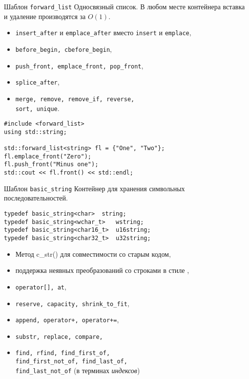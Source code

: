 \documentclass[aspectration=1610,t]{beamer}
\begin{document}
\begin{frame}[fragile]{Шаблон \texttt{forward\_list}}
Односвязный список. В любом месте контейнера 
вставка и удаление производятся за $O(1)$.
\begin{itemize}
    \item \texttt{insert\_after} и \texttt{emplace\_after} вместо \texttt{insert} и \texttt{emplace},
    \item  \texttt{before\_begin, cbefore\_begin},
    \item {\tt push\_front, emplace\_front, pop\_front},
    \item {\tt splice\_after},
    \item {\tt merge, remove, remove\_if, reverse,\\ sort, unique}.
\end{itemize}

\begin{lstlisting}
#include <forward_list>
using std::string;

std::forward_list<string> fl = {"One", "Two"};
fl.emplace_front("Zero");
fl.push_front("Minus one");
std::cout << fl.front() << std::endl;
\end{lstlisting}
\end{frame}

\begin{frame}[fragile]{Шаблон {\tt basic\_string}}
Контейнер для хранения символьных последовательностей.
\begin{lstlisting}
typedef basic_string<char>	string;
typedef basic_string<wchar_t> 	wstring;
typedef basic_string<char16_t> 	u16string;
typedef basic_string<char32_t>	u32string;
\end{lstlisting}
\begin{itemize}
    \item Метод {c\_str()} для совместимости со старым кодом, 
    \item поддержка неявных преобразований со строками в стиле \langc,
    \item \texttt{operator[], at},
    \item \texttt{reserve, capacity, shrink\_to\_fit},
    \item \texttt{append, operator+, operator+=},
    \item \texttt{substr, replace, compare,} 
    \item \texttt{find, rfind, find\_first\_of,\\ find\_first\_not\_of,
    find\_last\_of,\\ find\_last\_not\_of} (в терминах {\em индексов})
\end{itemize}
\end{frame}
\end{document}
